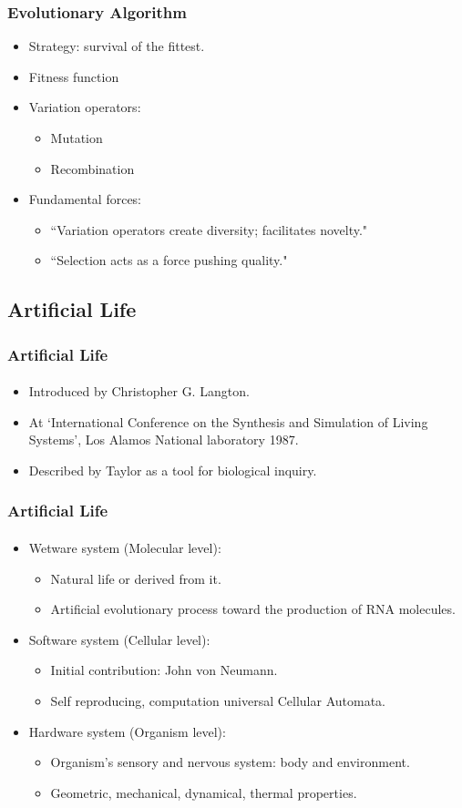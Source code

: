 \frame
{
	\frametitle{Evolutionary Algorithm}

	\begin{itemize}
		\item Strategy: survival of the fittest.
		\item Fitness function
		\item Variation operators:
			\begin{itemize}
				\item Mutation
				\item Recombination
			\end{itemize}
		\item Fundamental forces:
			\begin{itemize}
					\item ``Variation operators create diversity; facilitates novelty."
					\item ``Selection acts as a force pushing quality."
			\end{itemize}
	\end{itemize}
}

\subsection{Artificial Life}

\frame
{
	\frametitle{Artificial Life}
	\framesubtitle{}

	\begin{itemize}
		\item Introduced by Christopher G. Langton.
		\item At `International Conference on the Synthesis and Simulation of Living Systems', Los Alamos National laboratory 1987.
		\item Described by Taylor as a tool for biological inquiry.
	\end{itemize}
}

\frame
{
	\frametitle{Artificial Life}
	\framesubtitle{}

	\begin{itemize}
		\item Wetware system (Molecular level):
			\begin{itemize}
				\item Natural life or derived from it.
				\item Artificial evolutionary process toward the production of RNA molecules.
			\end{itemize}
		\item Software system (Cellular level):
			\begin{itemize}
				\item Initial contribution: John von Neumann.
				\item Self reproducing, computation universal Cellular Automata.
			\end{itemize}
		\item Hardware system (Organism level):
			\begin{itemize}
				\item Organism's sensory and nervous system: body and environment.
				\item Geometric, mechanical, dynamical, thermal properties.
			\end{itemize}
	\end{itemize}
}

